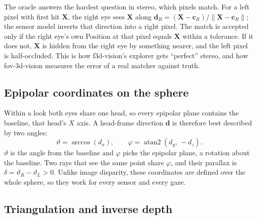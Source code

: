 \documentclass[11pt,a4paper]{article}
\newcommand{\vb}[1]{\mathbf{#1}}
\DeclareMathOperator{\atantwo}{atan2}
\begin{document}
The oracle answers the hardest question in stereo, which pixels match. For a left pixel with first hit
$\vb{X}$, the right eye sees $\vb{X}$ along $\vb{d}_R = (\vb{X} - \vb{c}_R)/\lVert\vb{X} - \vb{c}_R\rVert$; the
sensor model inverts that direction into a right pixel. The match is accepted only if the right eye's own
Position at that pixel equals $\vb{X}$ within a tolerance. If it does not, $\vb{X}$ is hidden from the right eye
by something nearer, and the left pixel is half-occluded. This is how f3d-vision's explorer gets ``perfect''
stereo, and how fov-3d-vision measures the error of a real matcher against truth.

\subsection{Epipolar coordinates on the sphere}\label{sec:epipolar}

Within a look both eyes share one head, so every epipolar plane contains the baseline, that head's $X$ axis. A head-frame direction
$\vb{d}$ is therefore best described by two angles:
\begin{equation}\label{eq:epi}
\vartheta = \arccos(d_x), \qquad \varphi = \atantwo(d_y,\, -d_z).
\end{equation}
$\vartheta$ is the angle from the baseline and $\varphi$ picks the epipolar plane, a rotation about the
baseline. Two rays that see the same point share $\varphi$, and their parallax is
$\delta = \vartheta_R - \vartheta_L > 0$. Unlike image disparity, these coordinates are defined over the whole
sphere, so they work for every sensor and every gaze.

\subsection{Triangulation and inverse depth}\label{sec:triang}
\end{document}
